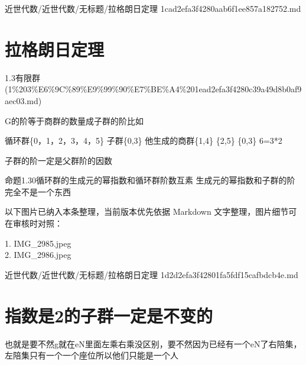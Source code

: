\begin{note}[来源路径]

近世代数/近世代数/无标题/拉格朗日定理 1cad2efa3f4280aab6f1ee857a182752.md

\end{note}

\section*{拉格朗日定理}

\begin{note}[来源上级主题]

1.3有限群 (1\%203\%E6\%9C\%89\%E9\%99\%90\%E7\%BE\%A4\%201ead2efa3f4280c39a49d8b0af9aec03.md)

\end{note}

\begin{theorem}[拉格朗日定理]

G的阶等于商群的数量成子群的阶比如

循环群\{0，1，2，3，4，5\} 子群\{0,3\} 他生成的商群\{1,4\} \{2,5\} \{0,3\} 6=3*2

子群的阶一定是父群阶的因数

命题1.30循环群的生成元的幂指数和循环群阶数互素 生成元的幂指数和子群的阶完全不是一个东西

\end{theorem}

\begin{note}[关联图片]
以下图片已纳入本条整理，当前版本优先依据 Markdown 文字整理，图片细节可在审核时对照：

1. IMG\_2985.jpeg\\
2. IMG\_2986.jpeg\\

\end{note}

\begin{note}[来源路径]

近世代数/近世代数/无标题/拉格朗日定理 1d2d2efa3f42801fa5fdf15cafbdcb4e.md

\end{note}

\section*{指数是2的子群一定是不变的}

\begin{note}

也就是要不然g就在eN里面左乘右乘没区别，要不然因为已经有一个eN了右陪集，左陪集只有一个一个座位所以他们只能是一个人

\end{note}

